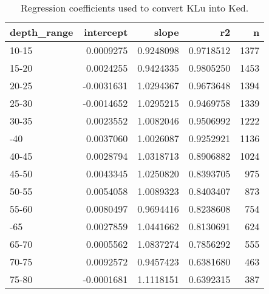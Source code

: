 \begin{table}[!h]

\caption{\label{tab:}Regression coefficients used to convert KLu into Ked.}
\centering
\begin{tabular}[t]{lrrrr}
\toprule
depth\_range & intercept & slope & r2 & n\\
\midrule
10-15 & 0.0009275 & 0.9248098 & 0.9718512 & 1377\\
15-20 & 0.0024255 & 0.9424335 & 0.9805250 & 1453\\
20-25 & -0.0031631 & 1.0294367 & 0.9673648 & 1394\\
25-30 & -0.0014652 & 1.0295215 & 0.9469758 & 1339\\
30-35 & 0.0023552 & 1.0082046 & 0.9506992 & 1222\\
\addlinespace
35-40 & 0.0037060 & 1.0026087 & 0.9252921 & 1136\\
40-45 & 0.0028794 & 1.0318713 & 0.8906882 & 1024\\
45-50 & 0.0043345 & 1.0250820 & 0.8393705 & 975\\
50-55 & 0.0054058 & 1.0089323 & 0.8403407 & 873\\
55-60 & 0.0080497 & 0.9694416 & 0.8238608 & 754\\
\addlinespace
60-65 & 0.0027859 & 1.0441662 & 0.8130691 & 624\\
65-70 & 0.0005562 & 1.0837274 & 0.7856292 & 555\\
70-75 & 0.0092572 & 0.9457423 & 0.6381680 & 463\\
75-80 & -0.0001681 & 1.1118151 & 0.6392315 & 387\\
\bottomrule
\end{tabular}
\end{table}
